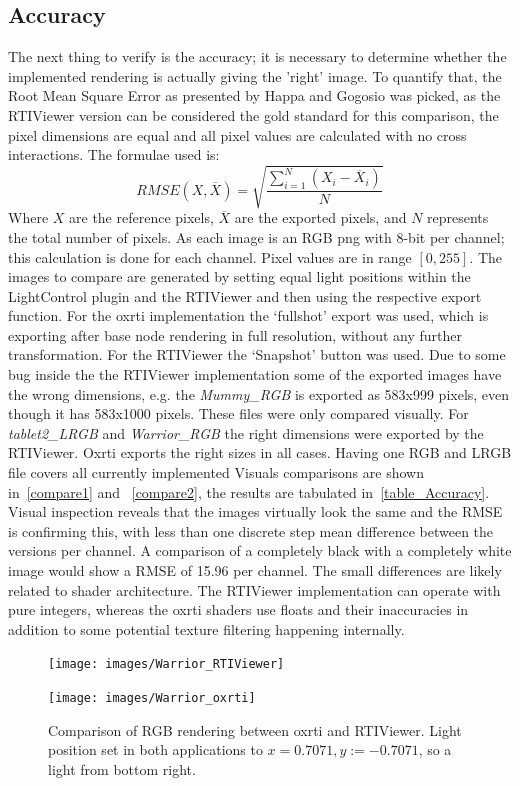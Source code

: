 \subsection{Accuracy}
The next thing to verify is the accuracy; it is necessary to determine whether
the implemented rendering is actually giving the 'right' image. To quantify that, the Root Mean Square Error as presented
by Happa and Gogosio\cite*{gogioso_pbr:_2017} was picked, as the RTIViewer
version can be considered the gold standard for this comparison, the pixel dimensions
are equal and all pixel values are calculated with no cross
interactions. The formulae used is:
$$RMSE(X, \overline X )= \sqrt{\frac{\sum_{i=1}^{N} (X_{i}-\overline
    X_{i})}{N}}$$
Where $X$ are the reference pixels, $\overline X$ are the exported pixels, and
$N$ represents the total number of pixels. As each image is an RGB png with
8-bit per channel; this calculation is done for each channel. Pixel values are
in range $[0, 255]$. The images to compare are generated by setting equal light
positions within the LightControl plugin and the RTIViewer and then using the
respective export function. For the oxrti implementation the `fullshot' export
was used, which is exporting after base node rendering in full resolution,
without any further transformation. For the RTIViewer the `Snapshot' button was
used. Due to some bug inside the the RTIViewer implementation some of the
exported images have the wrong dimensions, e.g. the \emph{Mummy\_RGB} is exported
as 583x999 pixels, even though it has 583x1000 pixels. These files were only
compared visually. For \emph{tablet2\_LRGB} and \emph{Warrior\_RGB} the right
dimensions were exported by the RTIViewer. Oxrti exports the right sizes in all
cases. Having one RGB and LRGB file covers all currently implemented  Visuals
comparisons are shown in~\autoref{compare1} and ~\autoref{compare2}, the results
are tabulated in~\autoref{table_Accuracy}. Visual inspection reveals that the
images virtually look the same and the RMSE is confirming this, with less than
one discrete step mean difference between the versions per channel. A
comparison of a completely black with a completely white image would show a RMSE
of 15.96 per channel. The small differences are likely related to shader
architecture. The RTIViewer implementation can operate with pure integers,
whereas the oxrti shaders use floats and their inaccuracies in addition to some
potential texture filtering happening internally.

\begin{figure}
\begin{subfloat}{\texttt{[image: images/Warrior\_RTIViewer]}}\end{subfloat}
\begin{subfloat}{\texttt{[image: images/Warrior\_oxrti]}}\end{subfloat}
\caption[Warrior Comparison]{Comparison of RGB rendering between oxrti and RTIViewer. Light position
set in both applications to $x=0.7071, y:=-0.7071$, so a light from bottom right.}
\label{compare1}
\end{figure}

